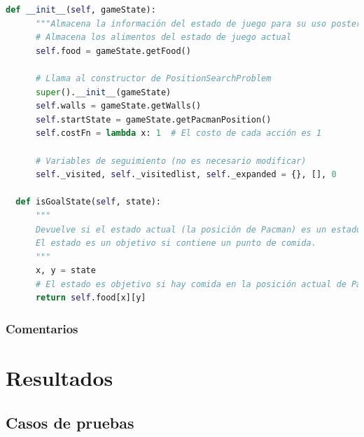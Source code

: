 \documentclass{report}
\begin{document}
\begin{lstlisting}[language=Python, caption=Implementación final del problema de las esquinas]
  def __init__(self, gameState):
      """Almacena la información del estado de juego para su uso posterior."""
      # Almacena los alimentos del estado de juego actual
      self.food = gameState.getFood()

      # Llama al constructor de PositionSearchProblem
      super().__init__(gameState)
      self.walls = gameState.getWalls()
      self.startState = gameState.getPacmanPosition()
      self.costFn = lambda x: 1  # El costo de cada acción es 1

      # Variables de seguimiento (no es necesario modificar)
      self._visited, self._visitedlist, self._expanded = {}, [], 0

  def isGoalState(self, state):
      """
      Devuelve si el estado actual (la posición de Pacman) es un estado objetivo.
      El estado es un objetivo si contiene un punto de comida.
      """
      x, y = state
      # El estado es objetivo si hay comida en la posición actual de Pacman
      return self.food[x][y]
          \end{lstlisting}
        \subsection*{Comentarios}
    \chapter{Resultados}
      \section{Casos de pruebas}
\end{document}
